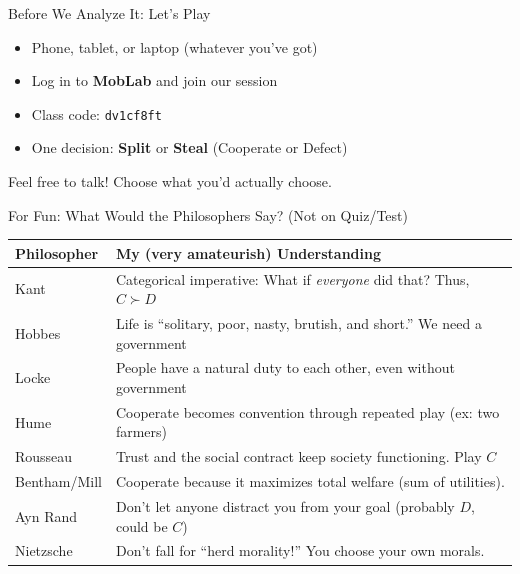 \begin{frame}{Before We Analyze It: Let's Play}
\begin{itemize}
    \item Phone, tablet, or laptop (whatever you've got)
    \item Log in to \textbf{MobLab} and join our session
    \item Class code: \hspace{0.1in} \texttt{dv1cf8ft}
    \item One decision: \textbf{Split} or \textbf{Steal} (Cooperate or Defect)
\end{itemize}
\bsk
Feel free to talk! Choose what you'd actually choose.
\vfill
\end{frame}

\begin{frame}{For Fun: What Would the Philosophers Say? (Not on Quiz/Test)}
  \begin{center}
  \renewcommand{\arraystretch}{1.6}
  \begin{tabular}{@{}ll@{}}
    \toprule
    \textbf{Philosopher} & \textbf{My (very amateurish) Understanding} \\
    \midrule
    Kant     & Categorical imperative: What if \textit{everyone} did that? Thus, $C\succ D$ \\
    Hobbes   & Life is ``solitary, poor, nasty, brutish, and short.'' We need a government \\
    Locke    & People have a natural duty to each other, even without government \\
    Hume     & Cooperate becomes convention through repeated play (ex: two farmers) \\
    Rousseau & Trust and the social contract keep society functioning. Play $C$ \\
    Bentham/Mill & Cooperate because it maximizes total welfare (sum of utilities). \\
    Ayn Rand     & Don't let anyone distract you from your goal (probably $D$, could be $C$) \\
    Nietzsche & Don't fall for ``herd morality!'' You choose your own morals. \\
    \bottomrule
  \end{tabular}
  \end{center}
\end{frame}

